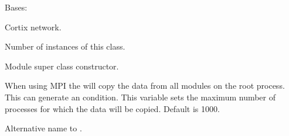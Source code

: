 \documentclass[letterpaper,10pt,openany,oneside,english]{sphinxmanual}
\begin{document}
\begin{fulllineitems}
\label{\detokenize{src_rst/network:network.Network}}
Bases: 

Cortix network.

\begin{fulllineitems}
\label{\detokenize{src_rst/network:network.Network.n_networks}}
 \textendash{} Number of instances of this class.

\end{fulllineitems}


\begin{fulllineitems}
\label{\detokenize{src_rst/network:network.Network.__init__}}
Module super class constructor.

\begin{fulllineitems}
\label{\detokenize{src_rst/network:network.Network.max_n_modules_for_data_copy_on_root}}
 \textendash{} When using MPI the  will copy the data from all modules on the
root process. This can generate an  condition. This variable
sets the maximum number of processes for which the data will be copied.
Default is 1000.

\end{fulllineitems}


\end{fulllineitems}


\begin{fulllineitems}
\label{\detokenize{src_rst/network:network.Network.add_module}}
Alternative name to .

\end{fulllineitems}


\end{fulllineitems}
\end{document}

